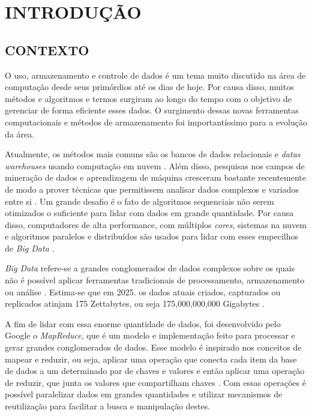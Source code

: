\chapter{INTRODUÇÃO} \label{cha:introducao}

\section{CONTEXTO} \label{sec:contexto}

O uso, armazenamento e controle de dados é um tema muito discutido na área de computação desde seus primórdios até os dias de hoje. Por causa disso, muitos métodos e algoritmos e termos surgiram ao longo do tempo com o objetivo de gerenciar de forma eficiente esses dados. O surgimento dessas novas ferramentas computacionais e métodos de armazenamento foi importantíssimo para a evolução da área. 

Atualmente, os métodos mais comuns são os bancos de dados relacionais e \textit{datas warehouses} usando computação em nuvem \cite{PastAndFutureTrendsData19}. Além disso, pesquisas nos campos de mineração de dados e aprendizagem de máquina cresceram bastante recentemente de modo a prover técnicas que permitissem analisar dados complexos e variados entre si \cite{ProgrammingBigData22}. Um grande desafio é o fato de algoritmos sequenciais não serem otimizados o suficiente para lidar com dados em grande quantidade. Por causa disso, computadores de alta performance, com múltiplos \textit{cores}, sistemas na nuvem e algoritmos paralelos e distribuídos são usados para lidar com esses empecilhos de \textit{Big Data} \cite{ProgrammingBigData22}.

\textit{Big Data} refere-se a grandes conglomerados de dados complexos sobre os quais não é possível aplicar ferramentas tradicionais de processamento, armazenamento ou análise \cite{OptmizationSoftwareHadoop18}. Estima-se que em 2025. os dados atuais criados, capturados ou replicados atinjam 175 Zettabytes, ou seja 175,000,000,000 Gigabytes \cite{DigitalizationWorld18}.

A fim de lidar com essa enorme quantidade de dados, foi desenvolvido pelo Google o \textit{MapReduce}, que é um modelo e implementação feito para processar e gerar grandes conglomerados de dados. Esse modelo é inspirado nos conceitos de mapear e reduzir, ou seja, aplicar uma operação que conecta cada item da base de dados a um determinado par de chaves e valores e então aplicar uma operação de reduzir, que junta os valores que compartilham chaves \cite{MapReduce04}. Com essas operações é possível paralelizar dados em grandes quantidades e utilizar mecanismos de reutilização para facilitar a busca e manipulação destes.


